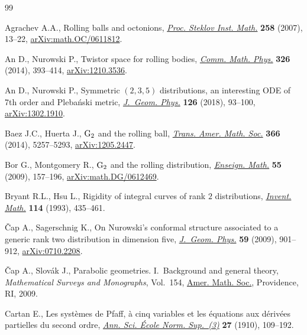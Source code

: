 \documentclass[pdftex]{sigma}
\numberwithin{equation}{section}
\begin{document}
\newpage
{}
\begin{thebibliography}{99}
\footnotesize\itemsep=0pt

Agrachev A.A., Rolling balls and octonions, \href{https://doi.org/10.1134/S0081543807030030}{\textit{Proc. Steklov Inst. Math.}}
 \textbf{258} (2007), 13--22, \href{https://arxiv.org/abs/math.OC/0611812}{arXiv:math.OC/0611812}.

An D., Nurowski P., Twistor space for rolling bodies, \href{https://doi.org/10.1007/s00220-013-1839-2}{\textit{Comm. Math.
 Phys.}} \textbf{326} (2014), 393--414, \href{https://arxiv.org/abs/1210.3536}{arXiv:1210.3536}.

An D., Nurowski P., Symmetric {$(2,3,5)$} distributions, an interesting {ODE}
 of 7th order and {P}leba\'{n}ski metric, \href{https://doi.org/10.1016/j.geomphys.2018.01.009}{\textit{J.~Geom. Phys.}} \textbf{126}
 (2018), 93--100, \href{https://arxiv.org/abs/1302.1910}{arXiv:1302.1910}.

Baez J.C., Huerta J., {${\rm G}_2$} and the rolling ball, \href{https://doi.org/10.1090/S0002-9947-2014-05977-1}{\textit{Trans. Amer.
 Math. Soc.}} \textbf{366} (2014), 5257--5293, \href{https://arxiv.org/abs/1205.2447}{arXiv:1205.2447}.

Bor G., Montgomery R., {${\rm G}_2$} and the rolling distribution,
 \href{https://doi.org/10.4171/LEM/55-1-8}{\textit{Enseign. Math.}} \textbf{55} (2009), 157--196,
 \href{https://arxiv.org/abs/math.DG/0612469}{arXiv:math.DG/0612469}.

Bryant R.L., Hsu L., Rigidity of integral curves of rank {$2$} distributions,
 \href{https://doi.org/10.1007/BF01232676}{\textit{Invent. Math.}} \textbf{114} (1993), 435--461.

\v{C}ap A., Sagerschnig K., On {N}urowski's conformal structure associated to a
 generic rank two distribution in dimension five, \href{https://doi.org/10.1016/j.geomphys.2009.04.001}{\textit{J.~Geom. Phys.}}
 \textbf{59} (2009), 901--912, \href{https://arxiv.org/abs/0710.2208}{arXiv:0710.2208}.

\v{C}ap A., Slov\'{a}k J., Parabolic geometries. {I}.~{B}ackground and general
 theory, \textit{Mathematical Surveys and Monographs}, Vol.~154, \href{https://doi.org/10.1090/surv/154}{Amer. Math.
 Soc.}, Providence, RI, 2009.

Cartan E., Les syst\`emes de {P}faff, \`a cinq variables et les \'{e}quations
 aux d\'{e}riv\'{e}es partielles du second ordre, \href{https://doi.org/10.24033/asens.618}{\textit{Ann. Sci. \'{E}cole
 Norm. Sup.~(3)}} \textbf{27} (1910), 109--192.


\end{thebibliography}
\end{document}
